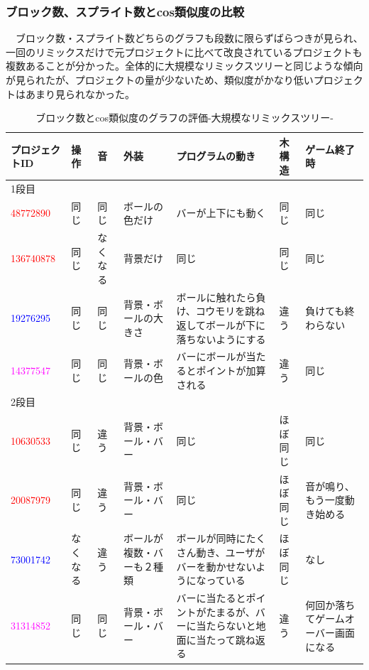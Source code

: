 \documentclass[a4paper,10pt,onecolumn,oneside,openany]{jsbook}
\begin{document}
\subsubsection{ブロック数、スプライト数とcos類似度の比較}
　ブロック数・スプライト数どちらのグラフも段数に限らずばらつきが見られ、一回のリミックスだけで元プロジェクトに比べて改良されているプロジェクトも複数あることが分かった。全体的に大規模なリミックスツリーと同じような傾向が見られたが、プロジェクトの量が少ないため、類似度がかなり低いプロジェクトはあまり見られなかった。

\begin{table}[h]
 \scriptsize
 \caption{ブロック数とcos類似度のグラフの評価-大規模なリミックスツリー-}
 \label{block}
 \begin{center}
\begin{tabular}{|p{1.7cm}||p{1cm}|p{1cm}|p{1.7cm}|p{2cm}|p{1cm}|p{1.7cm}|} \hline

プロジェクトID & 操作 & 音 & 外装 & プログラムの動き & 木構造 & ゲーム終了時 \\ \hline \hline
1段目 &  &  &  &  &  &  \\ \hline
\textcolor{red}{48772890} & 同じ & 同じ & ボールの色だけ & バーが上下にも動く & 同じ & 同じ \\ \hline
\textcolor{red}{136740878} & 同じ & なくなる & 背景だけ & 同じ & 同じ & 同じ \\ \hline
\textcolor{blue}{19276295} & 同じ & 同じ & 背景・ボールの大きさ & ボールに触れたら負け、コウモリを跳ね返してボールが下に落ちないようにする & 違う & 負けても終わらない \\ \hline
\textcolor{magenta}{14377547} & 同じ & 同じ & 背景・ボールの色 & バーにボールが当たるとポイントが加算される & 違う & 同じ \\ \hline

2段目 &  &  &  &  &  &  \\ \hline
\textcolor{red}{10630533} & 同じ & 違う & 背景・ボール・バー & 同じ & ほぼ同じ & 同じ \\ \hline
\textcolor{red}{20087979} & 同じ & 違う & 背景・ボール・バー & 同じ & ほぼ同じ & 音が鳴り、もう一度動き始める \\ \hline
\textcolor{blue}{73001742} & なくなる & 違う & ボールが複数・バーも２種類 & ボールが同時にたくさん動き、ユーザがバーを動かせないようになっている & ほぼ同じ & なし \\ \hline
\textcolor{magenta}{31314852} & 同じ & 同じ & 背景・ボール・バー & バーに当たるとポイントがたまるが、バーに当たらないと地面に当たって跳ね返る & 違う & 何回か落ちてゲームオーバー画面になる \\ \hline


\end{tabular}
\end{center}
\end{table}
\end{document}
